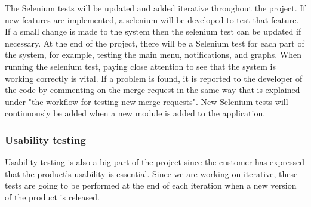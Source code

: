 \noindent The Selenium tests will be updated and added iterative throughout the project. If new features are implemented, a selenium will be developed to test that feature. If a small change is made to the system then the selenium test can be updated if necessary. At the end of the project, there will be a Selenium test for each part of the system, for example, testing the main menu, notifications, and graphs. When running the selenium test, paying close attention to see that the system is working correctly is vital. If a problem is found, it is reported to the developer of the code by commenting on the merge request in the same way that is explained under "the workflow for testing new merge requests". New Selenium tests will continuously be added when a new module is added to the application. \\
\subsubsection{Usability testing}
Usability testing is also a big part of the project since the customer has expressed that the product's usability is essential. Since we are working on iterative, these tests are going to be performed at the end of each iteration when a new version of the product is released. 
\newline

